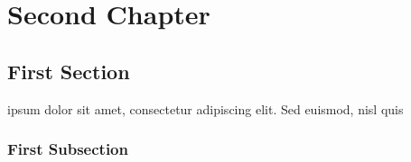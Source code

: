 \chapter*{Second Chapter}

\section*{First Section}

ipsum dolor sit amet, consectetur adipiscing elit. Sed euismod, nisl quis

\subsection*{First Subsection}